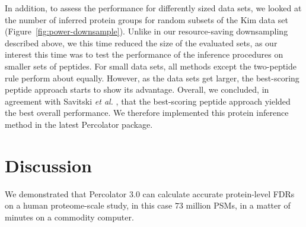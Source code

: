 \documentclass{article}
\begin{document}
In addition, to assess the performance for differently sized data
sets, we looked at the number of inferred protein groups for random
subsets of the Kim data set
(Figure~\ref{fig:power-downsample}). Unlike in our resource-saving
downsampling described above, we this time reduced the size of the
evaluated sets, as our interest this time was to test the performance
of the inference procedures on smaller sets of peptides. For small
data sets, all methods except the two-peptide rule perform about
equally. However, as the data sets get larger, the best-scoring
peptide approach starts to show its advantage. Overall, we concluded,
in agreement with Savitski {\em et al.} \cite{savitski2015scalable},
that the best-scoring peptide approach yielded the best overall
performance. We therefore implemented this protein inference method in
the latest Percolator package.


\section*{Discussion}

We demonstrated that Percolator 3.0 can calculate accurate
protein-level FDRs on a human proteome-scale study, in this case $73$
million PSMs, in a matter of minutes on a commodity computer.
\end{document}
